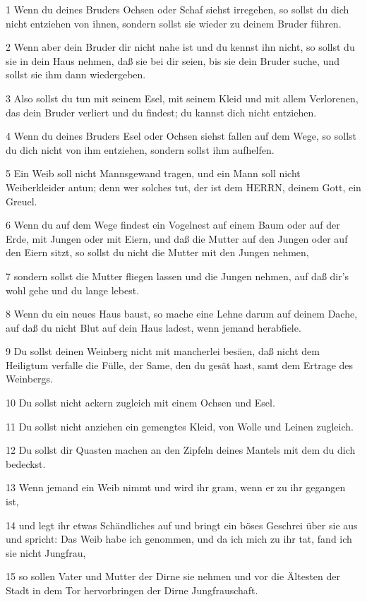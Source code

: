 \par 1 Wenn du deines Bruders Ochsen oder Schaf siehst irregehen, so sollst du dich nicht entziehen von ihnen, sondern sollst sie wieder zu deinem Bruder führen.
\par 2 Wenn aber dein Bruder dir nicht nahe ist und du kennst ihn nicht, so sollst du sie in dein Haus nehmen, daß sie bei dir seien, bis sie dein Bruder suche, und sollst sie ihm dann wiedergeben.
\par 3 Also sollst du tun mit seinem Esel, mit seinem Kleid und mit allem Verlorenen, das dein Bruder verliert und du findest; du kannst dich nicht entziehen.
\par 4 Wenn du deines Bruders Esel oder Ochsen siehst fallen auf dem Wege, so sollst du dich nicht von ihm entziehen, sondern sollst ihm aufhelfen.
\par 5 Ein Weib soll nicht Mannsgewand tragen, und ein Mann soll nicht Weiberkleider antun; denn wer solches tut, der ist dem HERRN, deinem Gott, ein Greuel.
\par 6 Wenn du auf dem Wege findest ein Vogelnest auf einem Baum oder auf der Erde, mit Jungen oder mit Eiern, und daß die Mutter auf den Jungen oder auf den Eiern sitzt, so sollst du nicht die Mutter mit den Jungen nehmen,
\par 7 sondern sollst die Mutter fliegen lassen und die Jungen nehmen, auf daß dir's wohl gehe und du lange lebest.
\par 8 Wenn du ein neues Haus baust, so mache eine Lehne darum auf deinem Dache, auf daß du nicht Blut auf dein Haus ladest, wenn jemand herabfiele.
\par 9 Du sollst deinen Weinberg nicht mit mancherlei besäen, daß nicht dem Heiligtum verfalle die Fülle, der Same, den du gesät hast, samt dem Ertrage des Weinbergs.
\par 10 Du sollst nicht ackern zugleich mit einem Ochsen und Esel.
\par 11 Du sollst nicht anziehen ein gemengtes Kleid, von Wolle und Leinen zugleich.
\par 12 Du sollst dir Quasten machen an den Zipfeln deines Mantels mit dem du dich bedeckst.
\par 13 Wenn jemand ein Weib nimmt und wird ihr gram, wenn er zu ihr gegangen ist,
\par 14 und legt ihr etwas Schändliches auf und bringt ein böses Geschrei über sie aus und spricht: Das Weib habe ich genommen, und da ich mich zu ihr tat, fand ich sie nicht Jungfrau,
\par 15 so sollen Vater und Mutter der Dirne sie nehmen und vor die Ältesten der Stadt in dem Tor hervorbringen der Dirne Jungfrauschaft.
